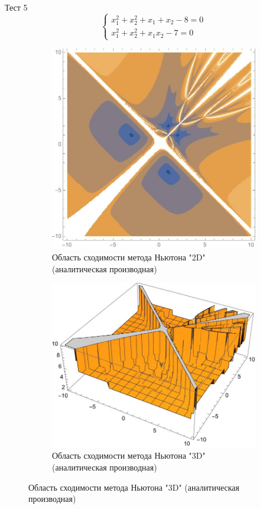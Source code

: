 \documentclass[12pt, a4paper]{article}
\begin{document}
	\newpage
	
	Тест 5
	\[
		\begin{cases}
		x_1^2+x_2^2+x_1+x_2-8=0\\
		x_1^2+x_2^2+x_1x_2-7=0
		\end{cases}
	\]


\begin{figure}[H]
	\centering
	\begin{subfigure}{0.45\textwidth}
		\includegraphics[width=\textwidth]{2D5}
		\caption{Область сходимости метода Ньютона "2D" (аналитическая производная)}
	\end{subfigure}
	\hfill
	\begin{subfigure}{0.45\textwidth}
		\includegraphics[width=\textwidth]{3D5}
		\caption{Область сходимости метода Ньютона "3D" (аналитическая производная)}
	\end{subfigure}
\end{figure}
\end{document}
